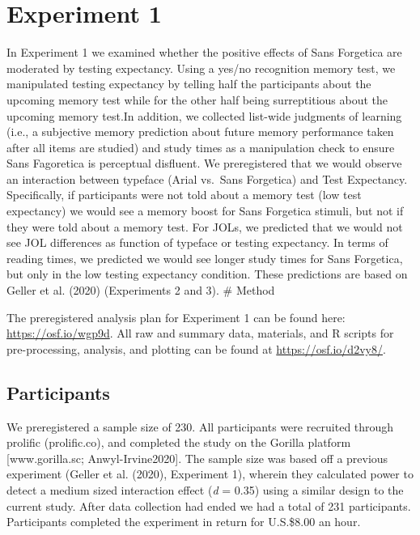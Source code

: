 \documentclass[
  english,
  jou]{apa6}
\begin{document}
\hypertarget{experiment-1}{%
\section{Experiment 1}\label{experiment-1}}

In Experiment 1 we examined whether the positive effects of Sans Forgetica are moderated by testing expectancy. Using a yes/no recognition memory test, we manipulated testing expectancy by telling half the participants about the upcoming memory test while for the other half being surreptitious about the upcoming memory test.In addition, we collected list-wide judgments of learning (i.e., a subjective memory prediction about future memory performance taken after all items are studied) and study times as a manipulation check to ensure Sans Fagoretica is perceptual disfluent. We preregistered that we would observe an interaction between typeface (Arial vs.~Sans Forgetica) and Test Expectancy. Specifically, if participants were not told about a memory test (low test expectancy) we would see a memory boost for Sans Forgetica stimuli, but not if they were told about a memory test. For JOLs, we predicted that we would not see JOL differences as function of typeface or testing expectancy. In terms of reading times, we predicted we would see longer study times for Sans Forgetica, but only in the low testing expectancy condition. These predictions are based on Geller et al. (2020) (Experiments 2 and 3).
\# Method

The preregistered analysis plan for Experiment 1 can be found here: \url{https://osf.io/wgp9d}. All raw and summary data, materials, and R scripts for pre-processing, analysis, and plotting can be found at \url{https://osf.io/d2vy8/}.

\hypertarget{participants}{%
\subsection{Participants}\label{participants}}

We preregistered a sample size of 230. All participants were recruited through prolific (prolific.co), and completed the study on the Gorilla platform {[}www.gorilla.sc; Anwyl-Irvine2020{]}. The sample size was based off a previous experiment (Geller et al. (2020), Experiment 1), wherein they calculated power to detect a medium sized interaction effect (\emph{d} = 0.35) using a similar design to the current study. After data collection had ended we had a total of 231 participants. Participants completed the experiment in return for U.S.\$8.00 an hour.
\end{document}
